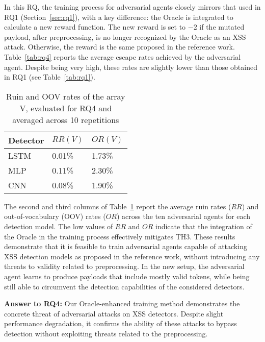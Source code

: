 In this RQ, the training process for adversarial agents closely mirrors that used in RQ1 (Section~\ref{sec:rq1}), with a key difference: the Oracle is integrated to calculate a new reward function. The new reward is set to $-2$ if the mutated payload, after  preprocessing, is no longer recognized by the Oracle as an XSS attack. Otherwise, the reward is the same proposed in the reference work. Table~\ref{tab:rq4} reports the average escape rates achieved by the adversarial agent. Despite being very high, these rates are slightly lower than those obtained in RQ1 (see Table~\ref{tab:rq1}).


\begin{table}[!h]
\caption{Ruin and OOV rates of the array V, evaluated for RQ4 and averaged across 10 repetitions}
\label{tab:rq4-rr}
\centering
\scalebox {1.0} {
\begin{tabular}{lll}
    \toprule
    Detector & $RR(V)$ & $OR(V)$ \\
    \midrule
    LSTM            & 0.01\% & 1.73\%    \\
    MLP             & 0.11\% & 2.30\%  \\
    CNN             & 0.08\% & 1.90\%   \\
    \bottomrule
\end{tabular}
}
\end{table}


The second and third columns of Table~\ref{tab:rq4-rr} report the average ruin rates ($RR$) and out-of-vocabulary (OOV) rates ($OR$) across the ten adversarial agents for each detection model. The low values of $RR$ and $OR$ indicate that the integration of the Oracle in the training process effectively mitigates TH3. These results demonstrate that it is feasible to train adversarial agents capable of attacking XSS detection models as proposed in the reference work, without introducing any threats to validity related to preprocessing. In the new setup, the adversarial agent learns to produce payloads that include mostly valid tokens, while being still able to circumvent the detection capabilities of the considered detectors.

\begin{tcolorbox}[boxrule=0pt,frame hidden,sharp corners,enhanced,borderline north={1pt}{0pt}{black},borderline south={1pt}{0pt}{black},boxsep=2pt,left=2pt,right=2pt,top=2.5pt,bottom=2pt]

\textbf{Answer to RQ4:} Our Oracle-enhanced training method demonstrates the concrete threat of adversarial attacks on XSS detectors. Despite slight performance degradation, it confirms the ability of these attacks to bypass detection without exploiting threats related to the preprocessing.

\end{tcolorbox}

